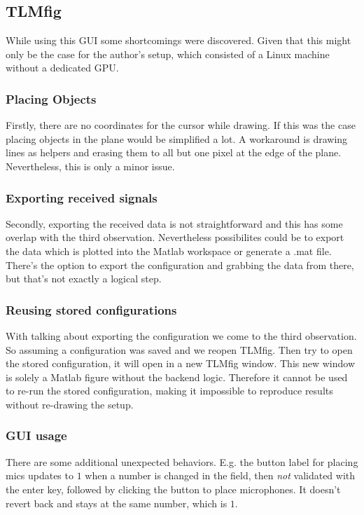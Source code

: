 \documentclass[twocolumn]{article}
\begin{document}
\subsection{TLMfig}
While using this GUI some shortcomings were discovered.
Given that this might only be the case for the author's setup, which consisted
of a Linux machine without a dedicated GPU.

\subsubsection{Placing Objects}
Firstly, there are no coordinates for the cursor while drawing.
If this was the case placing objects in the plane would be simplified a lot.
A workaround is drawing lines as helpers and erasing them to all but one pixel
at the edge of the plane.
Nevertheless, this is only a minor issue.

\subsubsection{Exporting received signals}
Secondly, exporting the received data is not straightforward and this has some
overlap with the third observation.
Nevertheless possibilites could be to export the data which is plotted into the
Matlab workspace or generate a .mat file.
There's the option to export the configuration and grabbing the data from there,
but that's not exactly a logical step.

\subsubsection{Reusing stored configurations}
With talking about exporting the configuration we come to the third observation.
So assuming a configuration was saved and we reopen TLMfig.
Then try to open the stored configuration, it will open in a new TLMfig window.
This new window is solely a Matlab figure without the backend logic.
Therefore it cannot be used to re-run the stored configuration, making it impossible
to reproduce results without re-drawing the setup.

\subsubsection{GUI usage}
There are some additional unexpected behaviors.
E.g. the button label for placing mics updates to $1$ when a number is changed in the field,
then \textit{not} validated with the enter key, followed by clicking the button to place microphones.
It doesn't revert back and stays at the same number, which is $1$.
\end{document}
